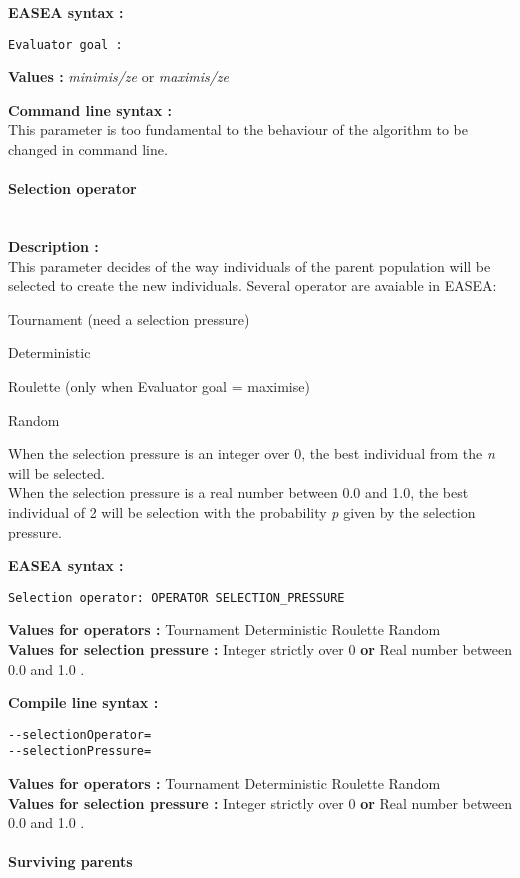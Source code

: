 \documentclass{book}
\begin{document}
\textbf{EASEA syntax :}

\texttt{Evaluator~goal~:}

\textbf{Values :} \emph{minimis/ze} or \emph{maximis/ze}

\textbf{Command line syntax :}\\This parameter is too fundamental to the
behaviour of the algorithm to be changed in command line.

\paragraph{Selection operator}\label{selection-operator}
~\\

\textbf{Description :}\\This parameter decides of the way individuals of
the parent population will be selected to create the new individuals.
Several operator are avaiable in EASEA:

Tournament (need a selection pressure)

Deterministic

Roulette (only when Evaluator goal = maximise)

Random

When the selection pressure is an integer over 0, the best individual
from the \emph{n} will be selected.\\When the selection pressure is a
real number between 0.0 and 1.0, the best individual of 2 will be
selection with the probability \emph{p} given by the selection pressure.

\textbf{EASEA syntax :}

\texttt{Selection~operator:~OPERATOR~SELECTION\_PRESSURE}

\textbf{Values for operators :} Tournament Deterministic Roulette
Random\\\textbf{Values for selection pressure :} Integer strictly over 0
\textbf{or} Real number between 0.0 and 1.0 .

\textbf{Compile line syntax :}

\texttt{-{}-selectionOperator=}\\\texttt{-{}-selectionPressure=}

\textbf{Values for operators :} Tournament Deterministic Roulette
Random\\\textbf{Values for selection pressure :} Integer strictly over 0
\textbf{or} Real number between 0.0 and 1.0 .

\paragraph{Surviving parents}\label{surviving-parents}
~\\
\end{document}
